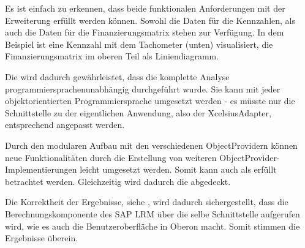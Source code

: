 \begin{onehalfspacing}
Es ist einfach zu erkennen, dass beide funktionalen Anforderungen mit der Erweiterung erfüllt werden können. Sowohl die Daten für die Kennzahlen, als auch die Daten für die Finanzierungsmatrix stehen zur Verfügung. In dem Beispiel ist eine Kennzahl mit dem Tachometer (unten) visualisiert, die Finanzierungsmatrix im oberen Teil als Liniendiagramm.

Die  wird dadurch gewährleistet, dass die komplette Analyse programmiersprachenunabhängig durchgeführt wurde. Sie kann mit jeder objektorientierten Programmiersprache umgesetzt werden - es müsste nur die Schnittstelle zu der eigentlichen Anwendung, also der XcelsiusAdapter, entsprechend angepasst werden.



Durch den modularen Aufbau mit den verschiedenen ObjectProvidern können neue Funktionalitäten durch die Erstellung von weiteren ObjectProvider-Implementierungen leicht umgesetzt werden. Somit kann auch  als erfüllt betrachtet werden. Gleichzeitig wird dadurch die  abgedeckt.

Die Korrektheit der Ergebnisse, siehe , wird dadurch sichergestellt, dass die Berechnungskomponente des SAP LRM über die selbe Schnittstelle aufgerufen wird, wie es auch die Benutzeroberfläche in Oberon macht. Somit stimmen die Ergebnisse überein.


\end{onehalfspacing}
